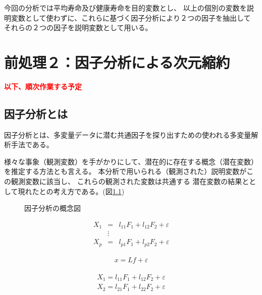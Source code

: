 \documentclass[a4j,11pt,mc]{jreport}
\newcommand{\tr}[1]{\textcolor{red}{\bf#1}} %
\begin{document}
今回の分析では平均寿命及び健康寿命を目的変数とし、
以上の個別の変数を説明変数として使わずに、これらに基づく因子分析により２つの因子を抽出して
それらの２つの因子を説明変数として用いる。


\chapter{前処理２：因子分析による次元縮約}\label{chapter:FA}

\tr{以下、順次作業する予定}
%
%
%


\section{因子分析とは}

因子分析とは、多変量データに潜む共通因子を探り出すための使われる多変量解析手法である。
%





様々な事象（観測変数）を手がかりにして、潜在的に存在する概念（潜在変数）を推定する方法とも言える。
本分析で用いられる（観測された）説明変数がこの観測変数に該当し、
これらの観測された変数は共通する
潜在変数の結果ととして現れたとの考え方である。(図\ref{FAdiagram})



\begin{figure}[H]
	\caption{因子分析の概念図}
	\label{FAdiagram}
\end{figure}



	\begin{eqnarray}
	X_1 &=&l_{11}F_1+l_{12}F_2+\varepsilon\\
	&\vdots&\\\nonumber
	X_p &=&l_{p1}F_1+l_{p2}F_2+\varepsilon
	\end{eqnarray}



		\begin{eqnarray}
		x=Lf+\varepsilon
		\end{eqnarray}

	\begin{eqnarray}
	\begin{split}
	X_1 =l_{11}F_1+l_{12}F_2+\varepsilon\\\nonumber
	X_2 =l_{21}F_1+l_{22}F_2+\varepsilon\\
	\end{split}
	\end{eqnarray}
\end{document}
